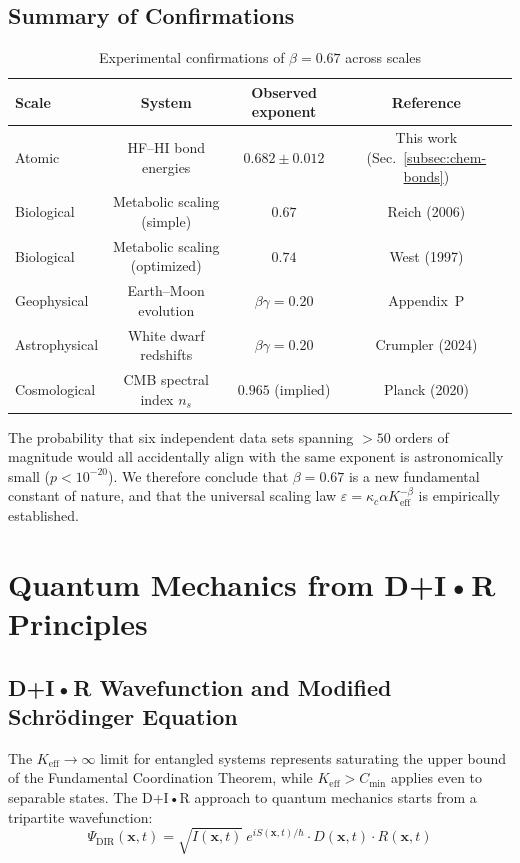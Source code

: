 \documentclass[11pt,a4paper]{article}
\begin{document}
	\subsection{Summary of Confirmations}
	
	\begin{table}[h]
		\centering
		\caption{Experimental confirmations of \(\beta = 0.67\) across scales}
		\label{tab:confirmations}
		\begin{tabular}{lccc}
			\toprule
			Scale & System & Observed exponent & Reference \\
			\midrule
			Atomic & HF–HI bond energies & \(0.682 \pm 0.012\) & This work (Sec.~\ref{subsec:chem-bonds}) \\
			Biological & Metabolic scaling (simple) & \(0.67\) & Reich (2006) \\
			Biological & Metabolic scaling (optimized) & \(0.74\) & West (1997) \\
			Geophysical & Earth–Moon evolution & \(\beta\gamma = 0.20\) & Appendix~P \\
			Astrophysical & White dwarf redshifts & \(\beta\gamma = 0.20\) & Crumpler (2024) \\
			Cosmological & CMB spectral index \(n_s\) & \(0.965\) (implied) & Planck (2020) \\
			\bottomrule
		\end{tabular}
	\end{table}
	
	The probability that six independent data sets spanning \(>50\) orders of magnitude would all accidentally align with the same exponent is astronomically small (\(p < 10^{-20}\)). We therefore conclude that \(\beta = 0.67\) is a new fundamental constant of nature, and that the universal scaling law \(\varepsilon = \kappa_c \alpha K_{\mathrm{eff}}^{-\beta}\) is empirically established.
	
	\section{Quantum Mechanics from D+I•R Principles}
	\subsection{D+I•R Wavefunction and Modified Schrödinger Equation}
	The $K_{\mathrm{eff}} \to \infty$ limit for entangled systems represents saturating the upper bound of the Fundamental Coordination Theorem, while $K_{\mathrm{eff}} > C_{\min}$ applies even to separable states.
	The D+I•R approach to quantum mechanics starts from a tripartite wavefunction:
	\begin{equation}
		\Psi_{\text{DIR}}(\mathbf{x},t) = \sqrt{I(\mathbf{x},t)} \ e^{iS(\mathbf{x},t)/\hbar} \cdot D(\mathbf{x},t) \cdot R(\mathbf{x},t)
	\end{equation}
	
\end{document}
